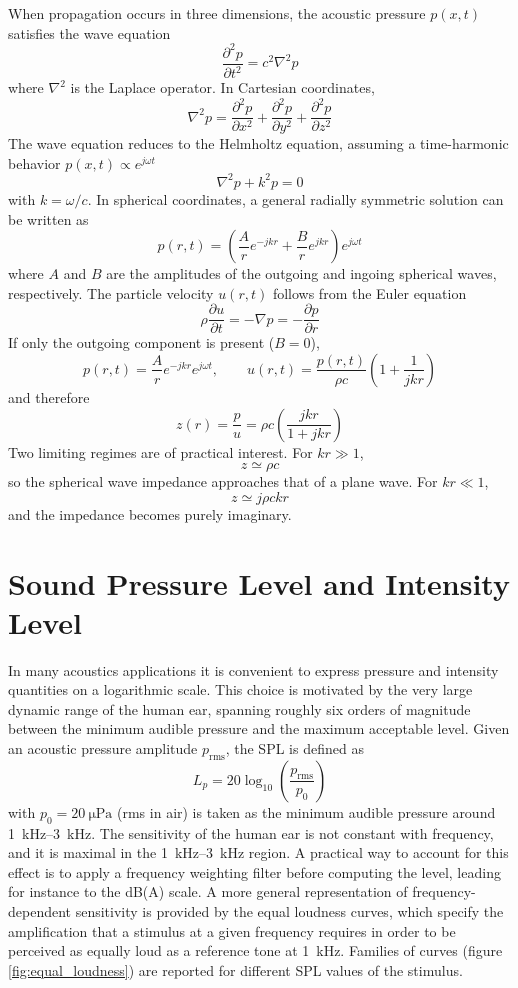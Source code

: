When propagation occurs in three dimensions, the acoustic pressure \( p(x,t) \) satisfies the wave equation
\[
\frac{\partial^{2} p}{\partial t^{2}} = c^{2} \nabla^{2} p
\]
where \( \nabla^{2} \) is the Laplace operator. In Cartesian coordinates,
\[
\nabla^{2} p = \frac{\partial^{2} p}{\partial x^{2}} + \frac{\partial^{2} p}{\partial y^{2}} + \frac{\partial^{2} p}{\partial z^{2}}
\]
The wave equation reduces to the Helmholtz equation, assuming a time-harmonic behavior \( p(x,t) \propto e^{j \omega t} \)
\[
\nabla^{2} p + k^{2} p = 0
\]
with \( k = \omega / c \). In spherical coordinates, a general radially symmetric solution can be written as
\[
p(r,t) = \left( \frac{A}{r} e^{-j k r} + \frac{B}{r} e^{j k r} \right) e^{j \omega t}
\]
where \( A \) and \( B \) are the amplitudes of the outgoing and ingoing spherical waves, respectively. The particle velocity \( u(r,t) \) follows from the Euler equation
\[
\rho \frac{\partial u}{\partial t} = -\nabla p = -\frac{\partial p}{\partial r}
\]
If only the outgoing component is present (\(B=0\)),
\[
p(r,t) = \frac{A}{r}e^{-jkr} e^{j\omega t},
\qquad
u(r,t) = \frac{p(r,t)}{\rho c}\left(1 + \frac{1}{jkr}\right)
\]
and therefore
\[
z(r)=\frac{p}{u}=\rho c\left(\frac{jkr}{1 + jkr}\right)
\]
Two limiting regimes are of practical interest. For \( k r \gg 1 \),
\[
z \simeq \rho c
\]
so the spherical wave impedance approaches that of a plane wave. For \( k r \ll 1 \),
\[
z \simeq j \rho c k r
\]
and the impedance becomes purely imaginary.

\section{Sound Pressure Level and Intensity Level}

In many acoustics applications it is convenient to express pressure and intensity quantities on a logarithmic scale. This choice is motivated by the very large dynamic range of the human ear, spanning roughly six orders of magnitude between the minimum audible pressure and the maximum acceptable level. Given an acoustic pressure amplitude \( p_{\mathrm{rms}} \), the SPL is defined as
\[
L_p = 20\log_{10}\left(\frac{p_{\mathrm{rms}}}{p_0}\right)
\]
with \( p_{0} = \SI{20}{\micro\pascal} \) (rms in air) is taken as the minimum audible pressure around \SIrange{1}{3}{\kilo\hertz}. The sensitivity of the human ear is not constant with frequency, and it is maximal in the \SIrange{1}{3}{\kilo\hertz} region. A practical way to account for this effect is to apply a frequency weighting filter before computing the level, leading for instance to the dB(A) scale. A more general representation of frequency-dependent sensitivity is provided by the equal loudness curves, which specify the amplification that a stimulus at a given frequency requires in order to be perceived as equally loud as a reference tone at \SI{1}{\kilo\hertz}. Families of curves (figure \ref{fig:equal_loudness}) are reported for different SPL values of the stimulus.

